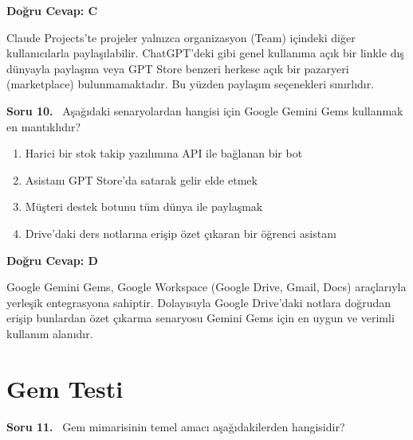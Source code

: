 \documentclass[11pt,a4paper,openany]{book}
\begin{document}
\vspace{4pt}
\begin{tcolorbox}[title=Cevap ve Açıklama, colback=gray!3!white, colframe=primarycolor!90!black, arc=2mm, fonttitle=\bfseries\sffamily, top=6pt, bottom=6pt]
    \textbf{Doğru Cevap: C}

    \vspace{2pt}
    Claude Projects'te projeler yalnızca organizasyon (Team) içindeki diğer kullanıcılarla paylaşılabilir. ChatGPT'deki gibi genel kullanıma açık bir linkle dış dünyayla paylaşma veya GPT Store benzeri herkese açık bir pazaryeri (marketplace) bulunmamaktadır. Bu yüzden paylaşım seçenekleri sınırlıdır.
\end{tcolorbox}
\vspace{10pt}
\needspace{5cm}
\vspace{8pt}
\noindent\textbf{\large\sffamily Soru 10.} \ Aşağıdaki senaryolardan hangisi için Google Gemini Gems kullanmak en mantıklıdır?

\begin{enumerate}[label=\Alph*), leftmargin=25pt, topsep=4pt, itemsep=2pt]
        \item Harici bir stok takip yazılımına API ile bağlanan bir bot
        \item Asistanı GPT Store'da satarak gelir elde etmek
        \item Müşteri destek botunu tüm dünya ile paylaşmak
        \item Drive'daki ders notlarına erişip özet çıkaran bir öğrenci asistanı
\end{enumerate}

\vspace{4pt}
\begin{tcolorbox}[title=Cevap ve Açıklama, colback=gray!3!white, colframe=primarycolor!90!black, arc=2mm, fonttitle=\bfseries\sffamily, top=6pt, bottom=6pt]
    \textbf{Doğru Cevap: D}

    \vspace{2pt}
    Google Gemini Gems, Google Workspace (Google Drive, Gmail, Docs) araçlarıyla yerleşik entegrasyona sahiptir. Dolayısıyla Google Drive'daki notlara doğrudan erişip bunlardan özet çıkarma senaryosu Gemini Gems için en uygun ve verimli kullanım alanıdır.
\end{tcolorbox}
\vspace{10pt}

\section{Gem Testi}
\needspace{5cm}
\vspace{8pt}
\noindent\textbf{\large\sffamily Soru 11.} \ Gem mimarisinin temel amacı aşağıdakilerden hangisidir?
\end{document}
